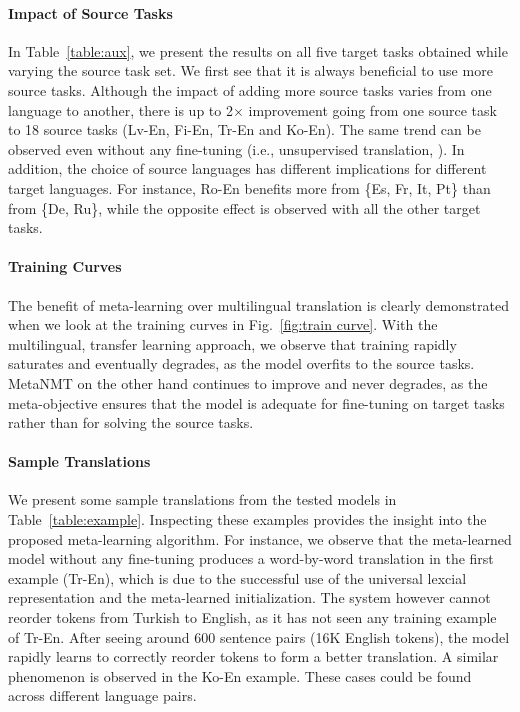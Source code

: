 \paragraph{Impact of Source Tasks}
In Table~\ref{table:aux}, we present the results on all five target tasks obtained while varying the source task set. We first see that it is always beneficial to use more source tasks. Although the impact of adding more source tasks varies from one language to another, there is up to 2$\times$ improvement going from one source task to 18 source tasks (Lv-En, Fi-En, Tr-En and Ko-En). The same trend can be observed even without any fine-tuning (i.e., unsupervised translation, \citep{lample2017unsupervised,artetxe2017unsupervised}). In addition, the choice of source languages has different implications for different target languages. For instance, Ro-En benefits more from \{Es, Fr, It, Pt\} than from \{De, Ru\}, while the opposite effect is observed with all the other target tasks. 

\paragraph{Training Curves}

The benefit of meta-learning over multilingual translation is clearly demonstrated when we look at the training curves in Fig.~\ref{fig:train curve}. With the multilingual, transfer learning approach, we observe that training rapidly saturates and eventually degrades, as the model overfits to the source tasks. MetaNMT on the other hand continues to improve and never degrades, as the meta-objective ensures that the model is adequate for fine-tuning on target tasks rather than for solving the source tasks.

\paragraph{Sample Translations}
We present some sample translations from the tested models in Table~\ref{table:example}. Inspecting these examples provides the insight into the proposed meta-learning algorithm. For instance, we observe that the meta-learned model without any fine-tuning produces a word-by-word translation in the first example (Tr-En), which is due to the successful use of the universal lexcial representation and the meta-learned initialization. The system however cannot reorder tokens from Turkish to English, as it has not seen any training example of Tr-En. After seeing around 600 sentence pairs (16K English tokens), the model rapidly learns to correctly reorder tokens to form a better translation. A similar phenomenon is observed in the Ko-En example. These cases could be found across different language pairs.  

